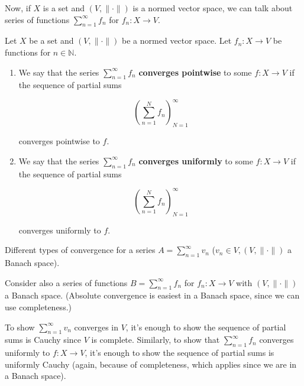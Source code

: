 Now, if \(X\) is a set and \((V, \lVert \cdot \rVert)\) is a normed vector space, we can talk about series of functions \(\sum_{n=1}^\infty f_n \) for \(f_n : X \to V\). 

\begin{definition}

Let \(X\) be a set and \((V, \lVert \cdot \rVert)\) be a normed vector space. Let \(f_n: X \to V\) be functions for \(n \in \mathbb{N}\). 

\begin{enumerate}

\item We say that the series \(\sum_{n=1}^\infty f_n\) \textbf{converges pointwise} to some \(f: X \to V\) if the sequence of partial sums 

\[
\left(  \sum_{n=1}^N f_n \right)_{N=1}^\infty 
\]

converges pointwise to \(f\).

\item We say that the series \(\sum_{n=1}^\infty f_n\) \textbf{converges uniformly} to some \(f: X \to V\) if the sequence of partial sums 

\[
\left(  \sum_{n=1}^N f_n \right)_{N=1}^\infty 
\]

converges uniformly to \(f\).

\end{enumerate}


\end{definition}

Different types of convergence for a series \(A = \sum_{n=1}^\infty v_n\) (\(v_n \in V, (V, \lVert \cdot \rVert)\) a Banach space).

Consider also a series of functions \(B = \sum_{n=1}^\infty f_n\) for \(f_n: X \to V\) with \((V, \lVert \cdot \rVert)\) a Banach space. (Absolute convergence is easiest in a Banach space, since we can use completeness.)

To show \(\sum_{n=1}^\infty v_n\)  converges in \(V\), it's enough to show the sequence of partial sums is Cauchy since \(V\) is complete. Similarly, to show that \(\sum_{n=1}^\infty f_n\) converges uniformly to \(f: X \to V\), it's enough to show the sequence of partial sums is uniformly Cauchy (again, because of completeness, which applies since we are in a Banach space).

